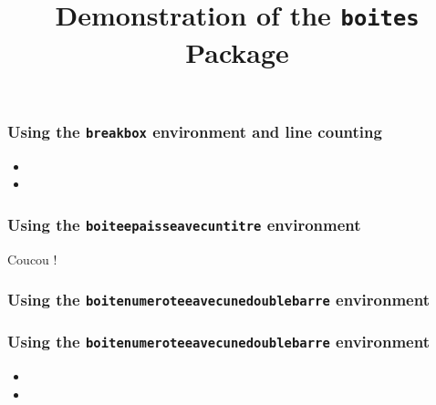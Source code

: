 \documentclass[a4paper,10pt]{article}
\begin{document}
\title{Demonstration of the \texttt{boites} Package}
\date{}
\maketitle

\subsubsection*{Using the \texttt{breakbox} environment and line counting}

\bkcounttrue
\begin{breakbox}
  \begin{itemize}
    \item \lipsum[1]
    \item \lipsum[2]
  \end{itemize}
\end{breakbox}

\subsubsection*{Using the \texttt{boiteepaisseavecuntitre} environment}

\begin{boiteepaisseavecuntitre}{ Coucou ! }
  \lipsum[1-3]
\end{boiteepaisseavecuntitre}

\subsubsection*{Using the \texttt{boitenumeroteeavecunedoublebarre} environment}

\begin{boitenumeroteeavecunedoublebarre}{3.5}
  \lipsum[1-3]
\end{boitenumeroteeavecunedoublebarre}

\subsubsection*{Using the \texttt{boitenumeroteeavecunedoublebarre} environment}

\begin{boitenumeroteeavecunedoublebarre}{3.5}
  \begin{itemize}
    \item \lipsum[1]
    \item \lipsum[2]
  \end{itemize}
\end{boitenumeroteeavecunedoublebarre}
\end{document}
